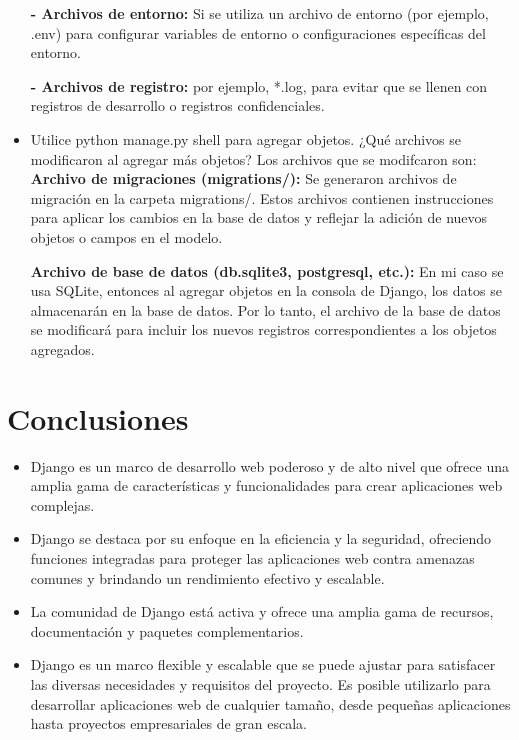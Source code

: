 \documentclass{article}
\begin{document}
\begin{itemize}
\textbf{- Archivos de entorno:} Si se utiliza un archivo de entorno (por ejemplo, .env) para configurar variables de entorno o configuraciones específicas del entorno.\newline

\textbf{- Archivos de registro:} por ejemplo, *.log, para evitar que se llenen con registros de desarrollo o registros confidenciales.\newline
  \item{Utilice python manage.py shell para agregar objetos. ¿Qué archivos se modificaron al agregar más objetos?}\newline
  Los archivos que se modifcaron son:\newline
  \textbf{Archivo de migraciones (migrations/):} Se generaron archivos de migración en la carpeta migrations/. Estos archivos contienen instrucciones para aplicar los cambios en la base de datos y reflejar la adición de nuevos objetos o campos en el modelo. \newline

\textbf{Archivo de base de datos (db.sqlite3, postgresql, etc.):} En mi caso se usa SQLite, entonces al agregar objetos en la consola de Django, los datos se almacenarán en la base de datos. Por lo tanto, el archivo de la base de datos se modificará para incluir los nuevos registros correspondientes a los objetos agregados.
  
	\end{itemize}	
 \newpage
 \section{Conclusiones}
	\begin{itemize}
		\item  Django es un marco de desarrollo web poderoso y de alto nivel que ofrece una amplia gama de características y funcionalidades para crear aplicaciones web complejas.
		\item Django se destaca por su enfoque en la eficiencia y la seguridad, ofreciendo funciones integradas para proteger las aplicaciones web contra amenazas comunes y brindando un rendimiento efectivo y escalable.
		\item La comunidad de Django está activa y ofrece una amplia gama de recursos, documentación y paquetes complementarios.
            \item Django es un marco flexible y escalable que se puede ajustar para satisfacer las diversas necesidades y requisitos del proyecto. Es posible utilizarlo para desarrollar aplicaciones web de cualquier tamaño, desde pequeñas aplicaciones hasta proyectos empresariales de gran escala.
	\end{itemize}	
\clearpage
\end{document}
